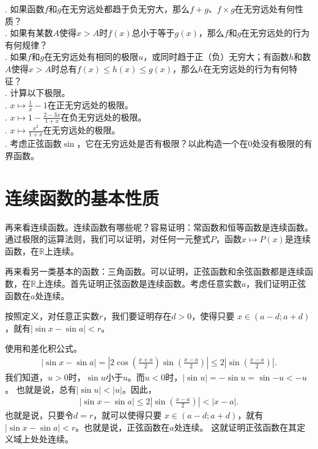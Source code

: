 \documentclass[12pt,UTF8]{ctexbook}
\begin{document}
\begin{xt}
    . 如果函数$f$和$g$在无穷远处都趋于负无穷大，那么$f + g$、$f \times g$在无穷远处有何性质？\\
    . 如果有某数$A$使得$x>A$时$f(x)$总小于等于$g(x)$，那么$f$和$g$在无穷远处的行为有何规律？\\
    . 如果$f$和$g$在无穷远处有相同的极限$u$，或同时趋于正（负）无穷大；有函数$h$和数$A$使得$x>A$时总有$f(x)\leqslant h(x)\leqslant g(x)$，那么$h$在无穷远处的行为有何特征？\\
    . 计算以下极限。\\
    . $x\mapsto \displaystyle \frac{1}{x} - 1$在正无穷远处的极限。\\
    . $x\mapsto \displaystyle 1 - \frac{2 - 3x}{1 + x}$在负无穷远处的极限。\\
    . $x\mapsto \displaystyle\frac{x^2}{1 + x}$在无穷远处的极限。\\
    . 考虑正弦函数$\sin$，它在无穷远处是否有极限？以此构造一个在$0$处没有极限的有界函数。
\end{xt}

\section{连续函数的基本性质}

再来看连续函数。连续函数有哪些呢？容易证明：常函数和恒等函数是连续函数。通过极限的运算法则，我们可以证明，对任何一元整式$P$，函数$x\mapsto P(x)$是连续函数，在$\mathbb{R}$上连续。

再来看另一类基本的函数：三角函数。可以证明，正弦函数和余弦函数都是连续函数，在$\mathbb{R}$上连续。首先证明正弦函数是连续函数。考虑任意实数$a$，我们证明正弦函数在$a$处连续。

按照定义，对任意正实数$r$，我们要证明存在$d>0$，使得只要
$x\in(a-d;a+d)$，就有$|\sin{x} - \sin{a}| < r$。

使用和差化积公式。
\begin{align*}
    |\sin{x} - \sin{a}| = \left|2\cos\left(\frac{x+a}{2}\right)\sin\left(\frac{x-a}{2}\right)\right| \leqslant 2 \left|\sin\left(\frac{x-a}{2}\right)\right|. 
\end{align*}
我们知道，$u>0$时，$\sin{u}$小于$u$。而$u<0$时，$|\sin{u}| = -\sin{u} = \sin{-u} < -u$。
也就是说，总有$|\sin{u}| < |u|$。因此，
\begin{align*}
    |\sin{x} - \sin{a}| \leqslant 2 \left|\sin\left(\frac{x-a}{2}\right)\right| <  \left|x-a\right|. 
\end{align*}
也就是说，只要令$d = r$，就可以使得只要
$x\in(a-d;a+d)$，就有$|\sin{x} - \sin{a}| < r$。也就是说，正弦函数在$a$处连续。
这就证明正弦函数在其定义域上处处连续。
\end{document}
